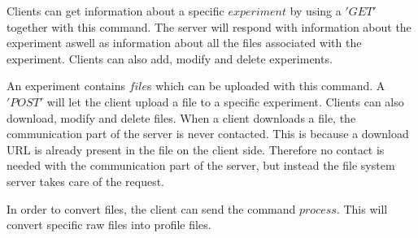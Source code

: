Clients can get information about a specific $experiment$ by using a $'GET'$ together with this command. The server will respond with information about the experiment aswell as information about all the files associated with the experiment. Clients can also add, modify and delete experiments. 

An experiment contains $file$s which can be uploaded with this command. A $'POST'$ will let the client upload a file to a specific experiment. Clients can also download, modify and delete files. When a client downloads a file, the communication part of the server is never contacted. This is because a download URL is already present in the file on the client side. Therefore no contact is needed with the communication part of the server, but instead the file system server takes care of the request. 

In order to convert files, the client can send the command $process$. This will convert specific raw files into profile files.